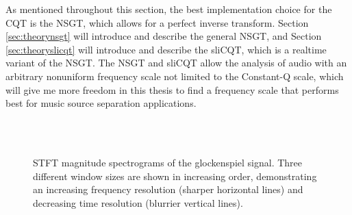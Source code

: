 \documentclass[report.tex]{subfiles}
\begin{document}
As mentioned throughout this section, the best implementation choice for the CQT is the NSGT, which allows for a perfect inverse transform. Section \ref{sec:theorynsgt} will introduce and describe the general NSGT, and Section \ref{sec:theoryslicqt} will introduce and describe the sliCQT, which is a realtime variant of the NSGT. The NSGT and sliCQT allow the analysis of audio with an arbitrary nonuniform frequency scale not limited to the Constant-Q scale, which will give me more freedom in this thesis to find a frequency scale that performs best for music source separation applications.

\begin{figure}[ht]
	\centering
	\\
	\\
	\caption{STFT magnitude spectrograms of the glockenspiel signal. Three different window sizes are shown in increasing order, demonstrating an increasing frequency resolution (sharper horizontal lines) and decreasing time resolution (blurrier vertical lines).}
	\label{fig:cqtvsstft1}
\end{figure}
\end{document}
